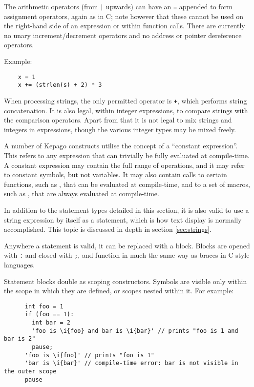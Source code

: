   The arithmetic operators (from \lstinline{|} upwards) can have an
  \lstinline|=| appended to form assignment operators, again as in C; note
  however that these cannot be used on the right-hand side of an expression or
  within function calls.  There are currently no unary increment/decrement
  operators and no address or pointer dereference operators.

  Example:
  \begin{lstlisting}
    x = 1
    x += (strlen(s) + 2) * 3
  \end{lstlisting}

  When processing strings, the only permitted operator is \lstinline|+|, which
  performs string concatenation. It is also legal, within integer expressions,
  to compare strings with the comparison operators.  Apart from that it is not
  legal to mix strings and integers in expressions, though the various integer
  types may be mixed freely.

  \label{constexprs}
  A number of Kepago constructs utilise the concept of a ``constant
  expression''. This refers to any expression that can trivially be fully
  evaluated at compile-time.  A constant expression may contain the full range
  of operations, and it may refer to constant symbols, but not variables.  It
  may also contain calls to certain functions, such as , that can
  be evaluated at compile-time, and to a set of macros, such as
  , that are always evaluated at compile-time.


  In addition to the statement types detailed in this section, it is also valid
  to use a string expression by itself as a statement, which is how text display
  is normally accomplished.  This topic is discussed in depth in section
  \ref{sec:strings}.


    Anywhere a statement is valid, it can be replaced with a block.  Blocks are
    opened with \lstinline|:| and closed with \lstinline|;|, and function in much
    the same way as braces in C-style languages.

    Statement blocks double as scoping constructors.  Symbols are visible only
    within the scope in which they are defined, or scopes nested within it.  For
    example:
    \begin{lstlisting}
      int foo = 1
      if (foo == 1):
        int bar = 2
        'foo is \i{foo} and bar is \i{bar}' // prints "foo is 1 and bar is 2"
        pause;
      'foo is \i{foo}' // prints "foo is 1"
      'bar is \i{bar}' // compile-time error: bar is not visible in the outer scope
      pause
    \end{lstlisting}

